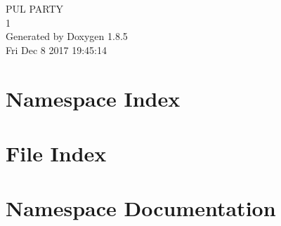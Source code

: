 \documentclass[twoside]{book}
\newcommand{\clearemptydoublepage}{%
  \newpage{\pagestyle{empty}\cleardoublepage}%
}
\begin{document}
\hypersetup{pageanchor=false}
\begin{titlepage}
\vspace*{7cm}
\begin{center}%
{\Large P\-U\-L P\-A\-R\-T\-Y \\[1ex]\large 1 }\\
\vspace*{1cm}
{\large Generated by Doxygen 1.8.5}\\
\vspace*{0.5cm}
{\small Fri Dec 8 2017 19:45:14}\\
\end{center}
\end{titlepage}
\clearemptydoublepage
\tableofcontents
\clearemptydoublepage
{}
\hypersetup{pageanchor=true}

\chapter{Namespace Index}

\chapter{File Index}

\chapter{Namespace Documentation}























\end{document}
